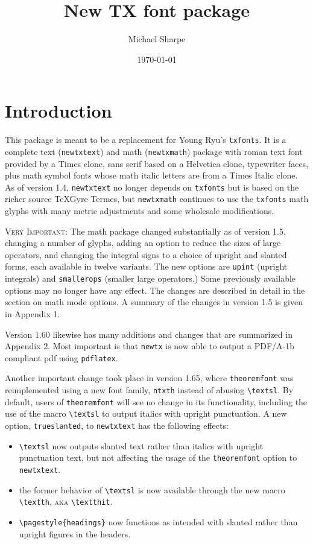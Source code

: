 \documentclass[\fsc]{article}
\title{New TX font package}
\author{Michael Sharpe}
\date{\today}  %
\theoremstyle{oldplain}
\theoremstyle{plain}
\begin{document}
\maketitle
\section{Introduction}
This package is meant to be a replacement for Young Ryu's {\tt txfonts}. It is  a complete text ({\tt newtxtext}) and math ({\tt newtxmath}) package with roman text font provided by  a Times clone, sans serif based on a \textsf{Helvetica} clone, typewriter faces, plus math symbol fonts whose math italic letters are from a Times Italic clone. As of version 1.4, {\tt newtxtext} no longer depends on {\tt txfonts} but is based on the richer source \textsf{TeXGyre Termes}, but {\tt newtxmath} continues to use the {\tt txfonts} math glyphs with many metric adjustments and some wholesale modifications.

\textsc{Very Important:} The math package changed substantially as of version 1.5, changing a number of glyphs, adding an option to reduce the sizes of large operators, and changing the integral signs to a choice of upright and slanted forms, each available in twelve variants. The new options are {\tt upint} (upright integrals) and {\tt smallerops} (smaller large operators.) Some previously available options may no longer have any effect. The changes are described in detail in the section on math mode options. A summary of the changes in version 1.5 is given in  Appendix 1. 

Version 1.60 likewise has many additions and changes that are summarized in Appendix 2. Most important is that {\tt newtx} is now able to output a PDF/A-1b compliant pdf using {\tt pdflatex}.

Another important change took place in version 1.65, where  {\tt theoremfont} was reimplemented using a new font family, {\tt ntxth} instead of abusing \verb|\textsl|. By default,  users of {\tt theoremfont} will see no change in its functionality, including the use of the macro \verb|\textsl| to output italics with upright punctuation. A new option, {\tt trueslanted}, to {\tt newtxtext} has the following effects:
\begin{itemize}
\item
\verb|\textsl| now outputs slanted text rather than italics with upright punctuation text, but not affecting the usage of the {\tt theoremfont} option to {\tt newtxtext}.
\item the former behavior of \verb|\textsl| is now available through the new macro \verb|\textth|, \textsc{aka} \verb|\textthit|.
\item \verb|\pagestyle{headings}| now functions as intended with slanted rather than upright figures in the headers.
\end{itemize}
\end{document}
